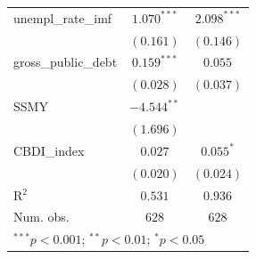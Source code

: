 \begin{table}
\begin{center}
\begin{tabular}{l c c}
unempl\_rate\_imf   & $1.070^{***}$  & $2.098^{***}$ \\
                    & $(0.161)$      & $(0.146)$     \\
gross\_public\_debt & $0.159^{***}$  & $0.055$       \\
                    & $(0.028)$      & $(0.037)$     \\
SSMY                & $-4.544^{**}$  &               \\
                    & $(1.696)$      &               \\
CBDI\_index         & $0.027$        & $0.055^{*}$   \\
                    & $(0.020)$      & $(0.024)$     \\
\hline
R$^2$               & $0.531$        & $0.936$       \\
Num. obs.           & $628$          & $628$         \\
\hline
\multicolumn{3}{l}{\scriptsize{$^{***}p<0.001$; $^{**}p<0.01$; $^{*}p<0.05$}}
\end{tabular}
\label{table:coefficients}
\end{center}
\end{table}
